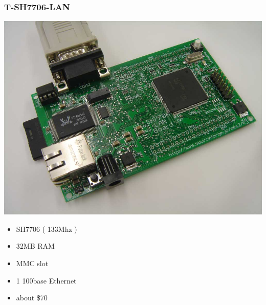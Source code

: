 \documentclass[cjk,dvipdfm,12pt]{beamer}
\begin{document}
\begin{frame}
 \frametitle{T-SH7706-LAN}
 \begin{minipage}[t]{0.4\hsize}
  \includegraphics[width=1.0\hsize]{image200705/t-sh7706lan.jpg}
 \end{minipage} 
 \begin{minipage}[t]{0.5\hsize}
  \begin{itemize}
   \item SH7706 ( 133Mhz )
   \item 32MB RAM 
   \item MMC slot 
   \item 1 100base Ethernet
   \item about \$70
  \end{itemize}
 \end{minipage}
\end{frame}
\end{document}
